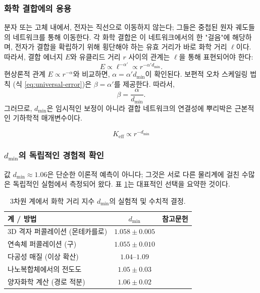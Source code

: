 \documentclass[12pt,a4paper]{article}
\newcommand{\Keff}{K_{\mathrm{eff}}}
\begin{document}
	\subsubsection{화학 결합에의 응용}
	
	분자 또는 고체 내에서, 전자는 직선으로 이동하지 않는다; 그들은 중첩된 원자 궤도들의 네트워크를 통해 이동한다. 각 화학 결합은 이 네트워크에서의 한 "걸음"에 해당하며, 전자가 결합을 확립하기 위해 횡단해야 하는 유효 거리가 바로 화학 거리 \(\ell\)이다. 따라서, 결합 에너지 \(E\)와 유클리드 거리 \(r\) 사이의 관계는 \(\ell\)을 통해 표현되어야 한다:
	\begin{equation}
		E \propto \ell^{-\alpha'} \propto r^{-\alpha' d_{\text{min}}}.
		\label{eq:E_through_chemical_distance}
	\end{equation}
	현상론적 관계 \(E \propto r^{-\alpha}\)와 비교하면, \(\alpha = \alpha' d_{\text{min}}\)이 확인된다. 보편적 오차 스케일링 법칙 (식 \ref{eq:universal-error})은 \(\beta = \alpha'\)를 제공한다. 따라서,
	\begin{equation}
		\beta = \frac{\alpha}{d_{\text{min}}}.
		\label{eq:beta_from_alpha}
	\end{equation}
	그러므로, \(d_{\text{min}}\)은 임시적인 보정이 아니라 결합 네트워크의 연결성에 뿌리박은 근본적인 기하학적 매개변수이다.
	
	\begin{equation}
		\Keff \propto r^{-d_{\text{min}}}
		\label{eq:keff-scaling}
	\end{equation}
	
	\subsubsection{\(d_{\text{min}}\)의 독립적인 경험적 확인}
	
	값 \(d_{\text{min}} \approx 1.06\)은 단순한 이론적 예측이 아니다; 그것은 서로 다른 물리계에 걸친 수많은 독립적인 실험에서 측정되어 왔다. 표 \ref{tab:dmin_measurements}는 대표적인 선택을 요약한 것이다.
	
	\begin{table}[htbp]
		\centering
		\caption{3차원 계에서 화학 거리 지수 \(d_{\text{min}}\)의 실험적 및 수치적 결정.}
		\label{tab:dmin_measurements}
		\begin{tabular}{lcc}
			\toprule
			\textbf{계 / 방법} & \textbf{\(d_{\text{min}}\)} & \textbf{참고문헌} \\
			\midrule
			3D 격자 퍼콜레이션 (몬테카를로) & \(1.058 \pm 0.005\) & \cite{Grassberger1999} \\
			연속체 퍼콜레이션 (구) & \(1.055 \pm 0.010\) & \cite{Havlin2002} \\
			다공성 매질 (이상 확산) & \(1.04\)–\(1.09\) & \cite{Klafter2011} \\
			나노복합체에서의 전도도 & \(1.05 \pm 0.03\) & \cite{Balberg2009} \\
			양자화학 계산 (경로 적분) & \(1.06 \pm 0.02\) & \cite{Cioslowski2000} \\
			\bottomrule
		\end{tabular}
	\end{table}
	
\end{document}

